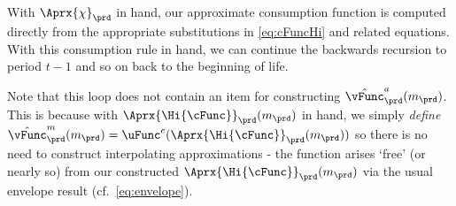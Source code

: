 \documentclass[\econtexRoot/SolvingMicroDSOPs]{subfiles}
\begin{document}
With $\Aprx{\chi}_{\prd}$ in hand, our approximate consumption function
is computed directly from the appropriate substitutions in \eqref{eq:cFuncHi}
and related equations.  With this consumption
rule in hand, we can continue the backwards recursion to period $t-1$
and so on back to the beginning of life.

Note that this loop does not contain an item for constructing $\hat{\vFunc}_{\prd}^{a}(m_{\prd})$. This is because with $\Aprx{\Hi{\cFunc}}_{\prd}(m_{\prd})$ in hand, we simply \textit{define} $\hat{\vFunc}^{m}_{\prd}(m_{\prd}) = \uFunc^{c}(\Aprx{\Hi{\cFunc}}_{\prd}(m_{\prd}))$ so there is no need to construct interpolating approximations - the function arises `free' (or nearly so) from our constructed $\Aprx{\Hi{\cFunc}}_{\prd}(m_{\prd})$ via the usual envelope result (cf.\ \eqref{eq:envelope}).
\end{document}
